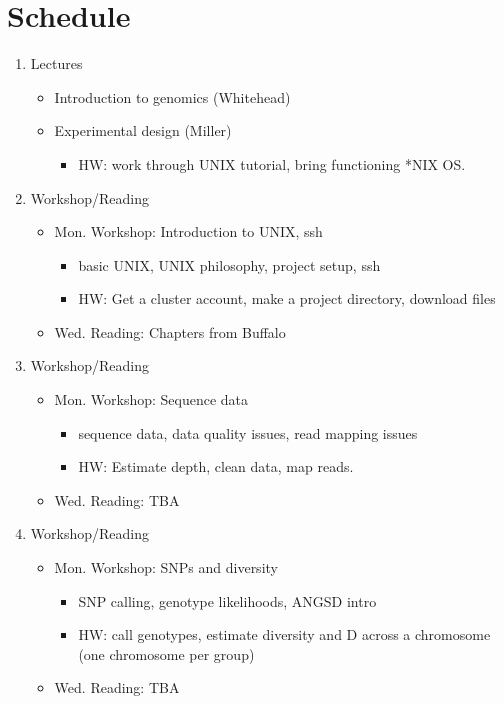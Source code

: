 \documentclass[]{article}
\begin{document}
\section*{Schedule}
\begin{enumerate}

\item Lectures
\begin{itemize}
\item Introduction to genomics (Whitehead)
\item Experimental design (Miller)
	\begin{itemize}
	\item HW: work through UNIX tutorial, bring functioning *NIX OS.
	\end{itemize}
\end{itemize}

\item Workshop/Reading
\begin{itemize}
	\item Mon. Workshop: Introduction to UNIX, ssh
	\begin{itemize}
		\item basic UNIX, UNIX philosophy, project setup, ssh
		\item HW: Get a cluster account, make a project directory, download files
	\end{itemize}
	\item Wed. Reading: Chapters from Buffalo
\end{itemize}

\item Workshop/Reading
	\begin{itemize}
	\item Mon. Workshop: Sequence data
		\begin{itemize}
		\item sequence data, data quality issues, read mapping issues
		\item HW: Estimate depth, clean data, map reads.
		\end{itemize}
	\item Wed. Reading: TBA
\end{itemize}

\item Workshop/Reading
	\begin{itemize}
	\item Mon. Workshop: SNPs and diversity
		\begin{itemize}
		\item SNP calling, genotype likelihoods, ANGSD intro
		\item HW: call genotypes, estimate diversity and D across a chromosome (one chromosome per group)
		\end{itemize}
	\item Wed. Reading: TBA
\end{itemize}


\end{enumerate}
\end{document}
